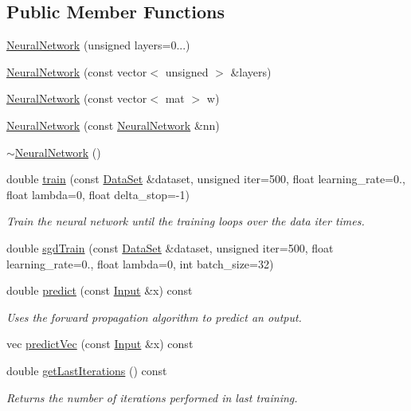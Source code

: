\subsection*{Public Member Functions}
\begin{DoxyCompactItemize}
\item 
\hyperlink{classhappyml_1_1NeuralNetwork_ab99bc065c560df1c116cc1eb26480f56}{Neural\+Network} (unsigned layers=0...)
\item 
\hyperlink{classhappyml_1_1NeuralNetwork_addf2c3d3d29a69a83876fd200a75d7ed}{Neural\+Network} (const vector$<$ unsigned $>$ \&layers)
\item 
\hyperlink{classhappyml_1_1NeuralNetwork_ae82d4d36bf87fbeaede4b7fcd8c3afd1}{Neural\+Network} (const vector$<$ mat $>$ w)
\item 
\hyperlink{classhappyml_1_1NeuralNetwork_a69f0a4cfa957f6a0b7cf669831939456}{Neural\+Network} (const \hyperlink{classhappyml_1_1NeuralNetwork}{Neural\+Network} \&nn)
\item 
\hyperlink{classhappyml_1_1NeuralNetwork_a4db646511b7f539b1f6e26220b7c9192}{$\sim$\+Neural\+Network} ()
\item 
double \hyperlink{classhappyml_1_1NeuralNetwork_a90aca4a568024edfd8c325b8f5aa5b74}{train} (const \hyperlink{classhappyml_1_1DataSet}{Data\+Set} \&dataset, unsigned iter=500, float learning\+\_\+rate=0., float lambda=0, float delta\+\_\+stop=-\/1)
\begin{DoxyCompactList}\small\item\em Train the neural network until the training loops over the data iter times. \end{DoxyCompactList}\item 
double \hyperlink{classhappyml_1_1NeuralNetwork_afd27297d91418b40ca7a943f313a4902}{sgd\+Train} (const \hyperlink{classhappyml_1_1DataSet}{Data\+Set} \&dataset, unsigned iter=500, float learning\+\_\+rate=0., float lambda=0, int batch\+\_\+size=32)
\item 
double \hyperlink{classhappyml_1_1NeuralNetwork_ae2e05acd3a864d20ca1a1645c1e369e4}{predict} (const \hyperlink{namespacehappyml_a03602d1ec49393790b8a0449f40cd01f}{Input} \&x) const 
\begin{DoxyCompactList}\small\item\em Uses the forward propagation algorithm to predict an output. \end{DoxyCompactList}\item 
vec \hyperlink{classhappyml_1_1NeuralNetwork_af4e1fbe2ef96f8a08b11dc9b9f0f7230}{predict\+Vec} (const \hyperlink{namespacehappyml_a03602d1ec49393790b8a0449f40cd01f}{Input} \&x) const 
\item 
double \hyperlink{classhappyml_1_1NeuralNetwork_a5653b6fb601bcb410aa9ff84611e428d}{get\+Last\+Iterations} () const 
\begin{DoxyCompactList}\small\item\em Returns the number of iterations performed in last training. \end{DoxyCompactList}\end{DoxyCompactItemize}
